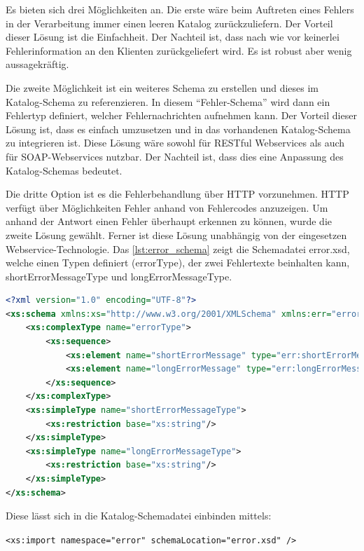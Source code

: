 Es bieten sich drei Möglichkeiten an. Die erste wäre beim Auftreten eines Fehlers in der Verarbeitung immer einen leeren Katalog zurückzuliefern. Der Vorteil dieser Lösung ist die Einfachheit. Der Nachteil ist, dass nach wie vor keinerlei Fehlerinformation an den Klienten zurückgeliefert wird. Es ist robust aber wenig aussagekräftig.

Die zweite Möglichkeit ist ein weiteres Schema zu erstellen und dieses im Katalog-Schema zu referenzieren. In diesem \enquote{Fehler-Schema} wird dann ein Fehlertyp definiert, welcher Fehlernachrichten aufnehmen kann. Der Vorteil dieser Lösung ist, dass es einfach umzusetzen und in das vorhandenen Katalog-Schema zu integrieren ist. Diese Lösung wäre sowohl für \gls{REST}ful \glspl{Webservice} als auch für \gls{SOAP}-\glspl{Webservice} nutzbar. Der Nachteil ist, dass dies eine Anpassung des Katalog-Schemas bedeutet. 

Die dritte Option ist es die Fehlerbehandlung über \gls{HTTP} vorzunehmen. \gls{HTTP} verfügt über Möglichkeiten Fehler anhand von Fehlercodes anzuzeigen. Um anhand der Antwort einen Fehler überhaupt erkennen zu können, wurde die zweite Lösung gewählt. Ferner ist diese Lösung unabhängig von der eingesetzen \gls{Webservice}-Technologie. Das \autoref{lst:error_schema} zeigt die Schemadatei error.xsd, welche einen Typen definiert (errorType), der zwei Fehlertexte beinhalten kann, shortErrorMessageType und longErrorMessageType. 

 \begin{lstlisting}[caption=Fehlerbehandlung - Error Schemadatei, language=xml, label=lst:error_schema]
<?xml version="1.0" encoding="UTF-8"?>
<xs:schema xmlns:xs="http://www.w3.org/2001/XMLSchema" xmlns:err="error" targetNamespace="error" elementFormDefault="qualified" attributeFormDefault="unqualified">
	<xs:complexType name="errorType">
		<xs:sequence>
			<xs:element name="shortErrorMessage" type="err:shortErrorMessageType" />
			<xs:element name="longErrorMessage" type="err:longErrorMessageType" />
		</xs:sequence>
	</xs:complexType>
	<xs:simpleType name="shortErrorMessageType">
		<xs:restriction base="xs:string"/>
	</xs:simpleType>
	<xs:simpleType name="longErrorMessageType">
		<xs:restriction base="xs:string"/>
	</xs:simpleType>
</xs:schema>
\end{lstlisting}

Diese lässt sich in die Katalog-Schemadatei einbinden mittels:

\lstinline[basicstyle=\ttfamily\small\mdseries]{<xs:import namespace="error" schemaLocation="error.xsd" /> }

